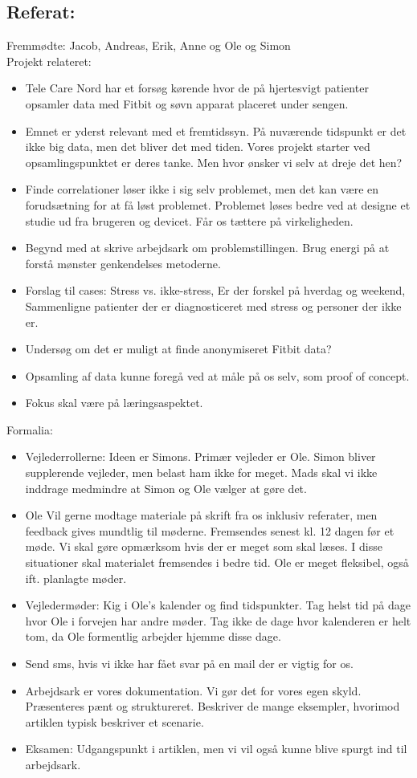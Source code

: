 \subsection*{Referat:}
Fremmødte: \tabto{7em} Jacob, Andreas, Erik, Anne og Ole og Simon \\
\newline
Projekt relateret:
\begin{itemize}
    \item Tele Care Nord har et forsøg kørende hvor de på hjertesvigt patienter opsamler data med Fitbit og søvn apparat placeret under sengen.
    \item Emnet er yderst relevant med et fremtidssyn. På nuværende tidspunkt er det ikke big data, men det bliver det med tiden. Vores projekt starter ved opsamlingspunktet er deres tanke. Men hvor ønsker vi selv at dreje det hen?
    \item Finde correlationer løser ikke i sig selv problemet, men det kan være en forudsætning for at få løst problemet. Problemet løses bedre ved at designe et studie ud fra brugeren og devicet. Får os tættere på virkeligheden.
    \item Begynd med at skrive arbejdsark om problemstillingen. Brug energi på at forstå mønster genkendelses metoderne.
    \item Forslag til cases: Stress vs. ikke-stress, Er der forskel på hverdag og weekend, Sammenligne patienter der er diagnosticeret med stress og personer der ikke er.
    \item Undersøg om det er muligt at finde anonymiseret Fitbit data?
    \item Opsamling af data kunne foregå ved at måle på os selv, som proof of concept.
    \item Fokus skal være på læringsaspektet. 
\end{itemize}
Formalia:
\begin{itemize}
    \item Vejlederrollerne: Ideen er Simons. Primær vejleder er Ole. Simon bliver supplerende vejleder, men belast ham ikke for meget. Mads skal vi ikke inddrage medmindre at Simon og Ole vælger at gøre det.
    \item Ole Vil gerne modtage materiale på skrift fra os inklusiv referater, men feedback gives mundtlig til møderne. Fremsendes senest kl. 12 dagen før et møde. Vi skal gøre opmærksom hvis der er meget som skal læses. I disse situationer skal materialet fremsendes i bedre tid. Ole er meget fleksibel, også ift. planlagte møder.
    \item Vejledermøder: Kig i Ole's kalender og find tidspunkter. Tag helst tid på dage hvor Ole i forvejen har andre møder. Tag ikke de dage hvor kalenderen er helt tom, da Ole formentlig arbejder hjemme disse dage.
    \item Send sms, hvis vi ikke har fået svar på en mail der er vigtig for os.
    \item Arbejdsark er vores dokumentation. Vi gør det for vores egen skyld. Præsenteres pænt og struktureret. Beskriver de mange eksempler, hvorimod artiklen typisk beskriver et scenarie.
    \item Eksamen: Udgangspunkt i artiklen, men vi vil også kunne blive spurgt ind til arbejdsark.
\end{itemize}
